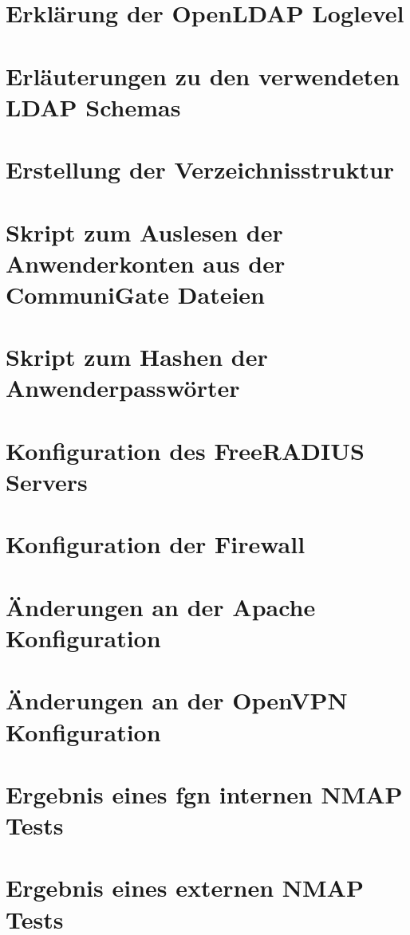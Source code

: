 \documentclass[11pt,a4paper,titlepage=firstiscover]{scrartcl} %
\begin{document}
\section{Erklärung der OpenLDAP Loglevel} \label{sec:LDAP-Loglevel}
\newpage
\section{Erläuterungen zu den verwendeten LDAP Schemas}\label{sec:LDAP-Schema}
\newpage
\section{Erstellung der Verzeichnisstruktur}\label{sec:Erstelle-DB}
\newpage
\section{Skript zum Auslesen der Anwenderkonten aus der CommuniGate Dateien}\label{sec:SkriptA}
\newpage
\section{Skript zum Hashen der Anwenderpasswörter}\label{sec:SkriptB}
\newpage
\section{Konfiguration des FreeRADIUS Servers}\label{sec:RADIUS-Konfig}
\newpage
\section{Konfiguration der Firewall}\label{sec:Firewall-Konfig}
\newpage
\section{Änderungen an der Apache Konfiguration}\label{sec:Apache-Konfig}
\newpage
\section{Änderungen an der OpenVPN Konfiguration}\label{sec:VPN-Konfig}
\newpage
\section{Ergebnis eines fgn internen NMAP Tests}\label{sec:NMAP-Test-int}
\newpage
\section{Ergebnis eines externen NMAP Tests}\label{sec:NMAP-Test-ext}

%
%
\end{document}
